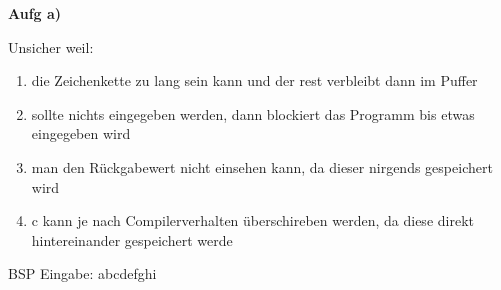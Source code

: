 \documentclass{article}
\begin{document}
        \textbf{Aufg a)}
        
         Unsicher weil:
        \begin{enumerate}
                \item die Zeichenkette zu lang sein kann und der rest verbleibt dann im Puffer
                \item sollte nichts eingegeben werden, dann blockiert das Programm bis etwas eingegeben wird
                \item man den Rückgabewert nicht einsehen kann, da dieser nirgends gespeichert wird
                \item c kann je nach Compilerverhalten überschireben werden, da diese direkt hintereinander gespeichert werde 
        \end{enumerate}
        BSP Eingabe: abcdefghi
        
\end{document}
